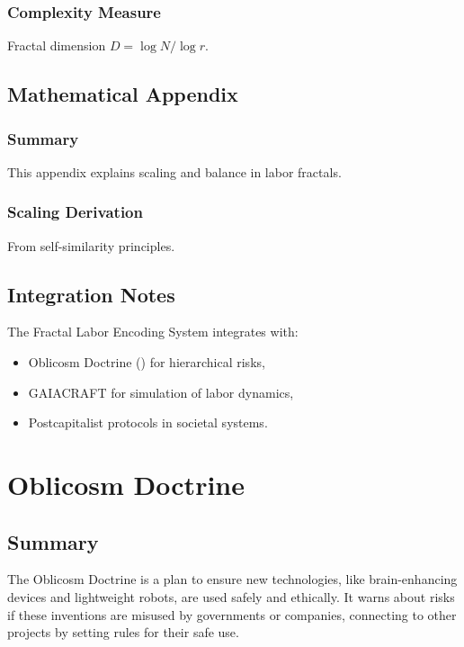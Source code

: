 \documentclass[11pt,oneside]{memoir}
\theoremstyle{plain}
\begin{document}
\subsection{Complexity Measure}
Fractal dimension \(D = \log N / \log r\).

\section{Mathematical Appendix}
\subsection{Summary}
This appendix explains scaling and balance in labor fractals.

\subsection{Scaling Derivation}
From self-similarity principles.

\section{Integration Notes}
The Fractal Labor Encoding System integrates with:
\begin{itemize}
    \item Oblicosm Doctrine () for hierarchical risks,
    \item GAIACRAFT for simulation of labor dynamics,
    \item Postcapitalist protocols in societal systems.
\end{itemize}

\chapter{Oblicosm Doctrine}
\label{sec:oblicosm_doctrine}

\section{Summary}
The Oblicosm Doctrine is a plan to ensure new technologies, like brain-enhancing devices and lightweight robots, are used safely and ethically. It warns about risks if these inventions are misused by governments or companies, connecting to other projects by setting rules for their safe use.
\end{document}
